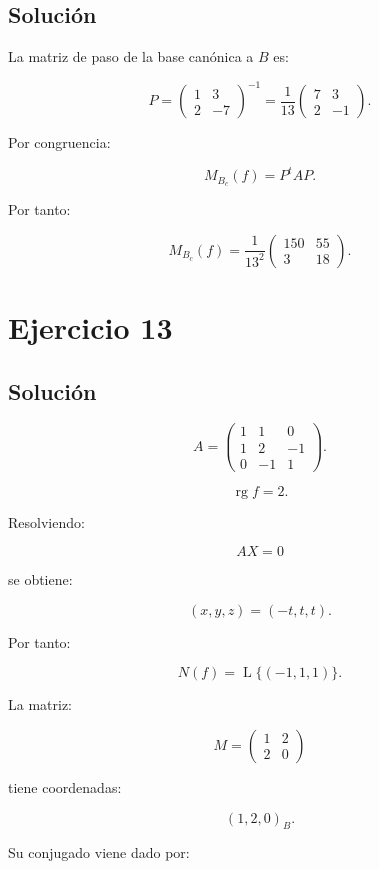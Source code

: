 \documentclass[11pt,a4paper]{article}
\newcommand{\rg}{\operatorname{rg}}
\newcommand{\Span}{\operatorname{L}}
\begin{document}
\subsection{Solución}

La matriz de paso de la base canónica a $B$ es:

\[
P=
\begin{pmatrix}
1&3\\
2&-7
\end{pmatrix}^{-1}
=
\frac1{13}
\begin{pmatrix}
7&3\\
2&-1
\end{pmatrix}.
\]

Por congruencia:

\[
M_{B_c}(f)=P^tAP.
\]

Por tanto:

\[
\boxed{
M_{B_c}(f)
=
\frac1{13^2}
\begin{pmatrix}
150&55\\
3&18
\end{pmatrix}.
}
\]

\section{Ejercicio 13}
\subsection{Solución}

\[
A=
\begin{pmatrix}
1&1&0\\
1&2&-1\\
0&-1&1
\end{pmatrix}.
\]

\[
\boxed{\rg f=2.}
\]

Resolviendo:

\[
AX=0
\]

se obtiene:

\[
(x,y,z)=(-t,t,t).
\]

Por tanto:

\[
\boxed{
N(f)=\Span\{(-1,1,1)\}.
}
\]

La matriz:

\[
M=
\begin{pmatrix}
1&2\\
2&0
\end{pmatrix}
\]

tiene coordenadas:

\[
(1,2,0)_B.
\]

Su conjugado viene dado por:
\end{document}
